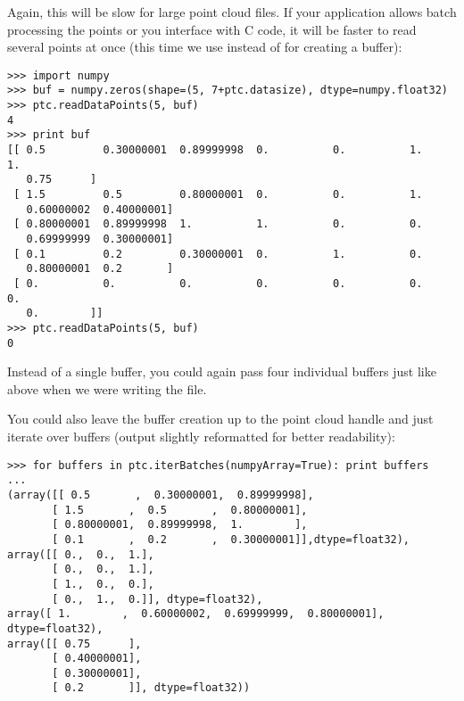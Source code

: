 Again, this will be slow for large point cloud files. If your application
allows batch processing the points or you interface with C code, it will be
faster to read several points at once (this time we use  instead
of  for creating a buffer):

\begin{verbatim}
>>> import numpy
>>> buf = numpy.zeros(shape=(5, 7+ptc.datasize), dtype=numpy.float32)
>>> ptc.readDataPoints(5, buf)
4
>>> print buf
[[ 0.5         0.30000001  0.89999998  0.          0.          1.          1.
   0.75      ]
 [ 1.5         0.5         0.80000001  0.          0.          1.
   0.60000002  0.40000001]
 [ 0.80000001  0.89999998  1.          1.          0.          0.
   0.69999999  0.30000001]
 [ 0.1         0.2         0.30000001  0.          1.          0.
   0.80000001  0.2       ]
 [ 0.          0.          0.          0.          0.          0.          0.
   0.        ]]
>>> ptc.readDataPoints(5, buf)
0
\end{verbatim}

Instead of a single buffer, you could again pass four individual buffers just
like above when we were writing the file.

You could also leave the buffer creation up to the point cloud handle and just
iterate over buffers (output slightly reformatted for better readability):

\begin{verbatim}
>>> for buffers in ptc.iterBatches(numpyArray=True): print buffers
... 
(array([[ 0.5       ,  0.30000001,  0.89999998],
       [ 1.5       ,  0.5       ,  0.80000001],
       [ 0.80000001,  0.89999998,  1.        ],
       [ 0.1       ,  0.2       ,  0.30000001]],dtype=float32),
array([[ 0.,  0.,  1.],
       [ 0.,  0.,  1.],
       [ 1.,  0.,  0.],
       [ 0.,  1.,  0.]], dtype=float32),
array([ 1.        ,  0.60000002,  0.69999999,  0.80000001], dtype=float32),
array([[ 0.75      ],
       [ 0.40000001],
       [ 0.30000001],
       [ 0.2       ]], dtype=float32))
\end{verbatim}

